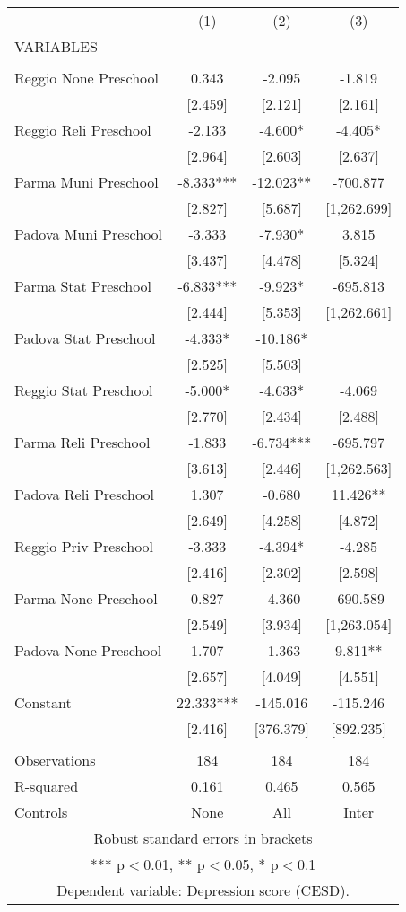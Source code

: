 \begin{tabular}{lccc} \hline
 & (1) & (2) & (3) \\
VARIABLES &  &  &  \\ \hline
 &  &  &  \\
Reggio None Preschool & 0.343 & -2.095 & -1.819 \\
 & [2.459] & [2.121] & [2.161] \\
Reggio Reli Preschool & -2.133 & -4.600* & -4.405* \\
 & [2.964] & [2.603] & [2.637] \\
Parma Muni Preschool & -8.333*** & -12.023** & -700.877 \\
 & [2.827] & [5.687] & [1,262.699] \\
Padova Muni Preschool & -3.333 & -7.930* & 3.815 \\
 & [3.437] & [4.478] & [5.324] \\
Parma Stat Preschool & -6.833*** & -9.923* & -695.813 \\
 & [2.444] & [5.353] & [1,262.661] \\
Padova Stat Preschool & -4.333* & -10.186* &  \\
 & [2.525] & [5.503] &  \\
Reggio Stat Preschool & -5.000* & -4.633* & -4.069 \\
 & [2.770] & [2.434] & [2.488] \\
Parma Reli Preschool & -1.833 & -6.734*** & -695.797 \\
 & [3.613] & [2.446] & [1,262.563] \\
Padova Reli Preschool & 1.307 & -0.680 & 11.426** \\
 & [2.649] & [4.258] & [4.872] \\
Reggio Priv Preschool & -3.333 & -4.394* & -4.285 \\
 & [2.416] & [2.302] & [2.598] \\
Parma None Preschool & 0.827 & -4.360 & -690.589 \\
 & [2.549] & [3.934] & [1,263.054] \\
Padova None Preschool & 1.707 & -1.363 & 9.811** \\
 & [2.657] & [4.049] & [4.551] \\
Constant & 22.333*** & -145.016 & -115.246 \\
 & [2.416] & [376.379] & [892.235] \\
 &  &  &  \\
Observations & 184 & 184 & 184 \\
R-squared & 0.161 & 0.465 & 0.565 \\
 Controls & None & All & Inter \\ \hline
\multicolumn{4}{c}{ Robust standard errors in brackets} \\
\multicolumn{4}{c}{ *** p$<$0.01, ** p$<$0.05, * p$<$0.1} \\
\multicolumn{4}{c}{ Dependent variable: Depression score (CESD).} \\
\end{tabular}
